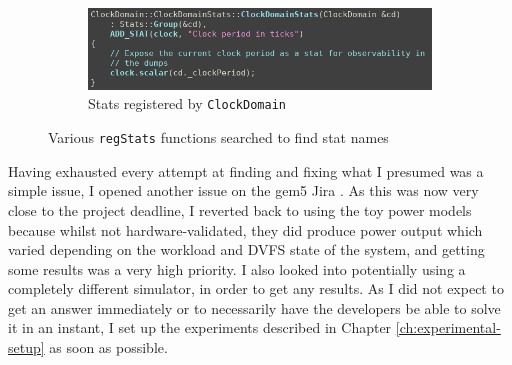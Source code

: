 \begin{figure}[H]
\begin{minipage}[b]{0.45\textwidth}
\begin{subfigure}[b]{\linewidth}
            \centering
            \includegraphics[width=\textwidth]{screenshots/have-to-search-src-for-regStats/clock-domain-registers-a-stat.png}
            \caption{Stats registered by \texttt{ClockDomain}}
            \label{subfig:clk-dom-regStats}
        \end{subfigure}
    \end{minipage}
    \caption{Various \texttt{regStats} functions searched to find stat 
             names}
    \label{fig:regstats-search}
\end{figure}

Having exhausted every attempt at finding and fixing what I presumed was a 
simple issue, I opened another issue on the gem5 Jira 
\cite{hansen_gem5-463_2020}. As this was now very close to the project 
deadline, I reverted back to using the toy power models because whilst not 
hardware-validated, they did produce power output which varied depending on 
the workload and DVFS state of the system, and getting some results was a 
very high priority. I also looked into potentially using a completely 
different simulator, in order to get any results. As I did not expect to 
get an answer immediately or to necessarily have the developers be able to 
solve it in an instant, I set up the experiments described in Chapter 
\ref{ch:experimental-setup} as soon as possible.

